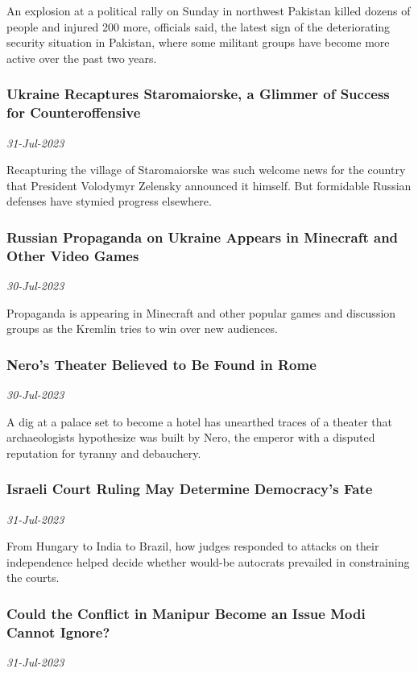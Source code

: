 An explosion at a political rally on Sunday in northwest Pakistan killed dozens of people and injured 200 more, officials said, the latest sign of the deteriorating security situation in Pakistan, where some militant groups have become more active over the past two years.
\subsubsection{Ukraine Recaptures Staromaiorske, a Glimmer of Success for Counteroffensive \href{https://www.nytimes.com/2023/07/30/world/europe/ukraine-counteroffensive-russia.html}{}}
\textit{31-Jul-2023}

Recapturing the village of Staromaiorske was such welcome news for the country that President Volodymyr Zelensky announced it himself. But formidable Russian defenses have stymied progress elsewhere.
\subsubsection{Russian Propaganda on Ukraine Appears in Minecraft and Other Video Games \href{https://www.nytimes.com/2023/07/30/technology/russia-propaganda-video-games.html}{}}
\textit{30-Jul-2023}

Propaganda is appearing in Minecraft and other popular games and discussion groups as the Kremlin tries to win over new audiences.
\subsubsection{Nero’s Theater Believed to Be Found in Rome \href{https://www.nytimes.com/2023/07/30/world/europe/rome-nero-theater.html}{}}
\textit{30-Jul-2023}

A dig at a palace set to become a hotel has unearthed traces of a theater that archaeologists hypothesize was built by Nero, the emperor with a disputed reputation for tyranny and debauchery.
\subsubsection{Israeli Court Ruling May Determine Democracy’s Fate \href{https://www.nytimes.com/2023/07/30/world/middleeast/israel-court-democracys.html}{}}
\textit{31-Jul-2023}

From Hungary to India to Brazil, how judges responded to attacks on their independence helped decide whether would-be autocrats prevailed in constraining the courts.
\subsubsection{Could the Conflict in Manipur Become an Issue Modi Cannot Ignore? \href{https://www.nytimes.com/2023/07/30/world/asia/india-manipur-modi.html}{}}
\textit{31-Jul-2023}

